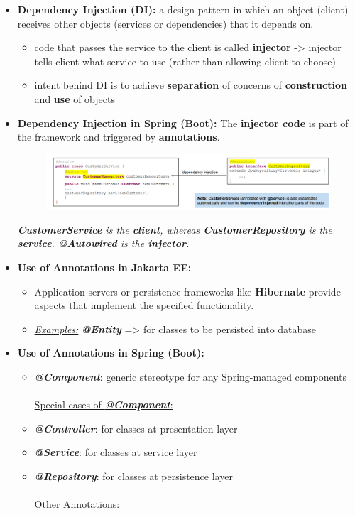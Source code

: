 \documentclass[ieeetran]{article}
\begin{document}
\begin{itemize}
\item \textbf{Dependency Injection (DI):} a design pattern in which an object (client) receives other objects (services or dependencies) that it depends on. 
	\begin{itemize} 
	\item code that passes the service to the client is called \textbf{injector} -> injector tells client what service to use (rather than allowing client to choose)

	\item intent behind DI is to achieve \textbf{separation} of concerns of \textbf{construction} and \textbf{use} of objects
	\end{itemize}
\item \textbf{Dependency Injection in Spring (Boot):} The \textbf{injector code} is part of the framework and triggered by \textbf{annotations}.
\begin{figure}[h!]
  \centering
  \includegraphics[width=1.0\linewidth]{dicustomer.png}
  \label{fig:dicustomer_png}
\end{figure}

\textit{\textbf{CustomerService} is the \textbf{client}, whereas \textbf{CustomerRepository} is the \textbf{service}. \textbf{@Autowired} is the \textbf{injector}.}

\item \textbf{Use of Annotations in Jakarta EE:}
\begin{itemize}
  \item Application servers or persistence frameworks like \textbf{Hibernate} provide aspects that implement the specified functionality.
\item \textit{\underline{Examples:}} \textbf{\textit{@Entity}} => for classes to be persisted into database
\end{itemize}
\item \textbf{Use of Annotations in Spring (Boot):}
	\begin{itemize}
	  \item \textbf{\textit{@Component}}: generic stereotype for any Spring-managed components\\ \\
		  \underline{Special cases of \textbf{\textit{@Component}}:}
	\item \textbf{\textit{@Controller}}: for classes at presentation layer
	\item \textbf{\textit{@Service}}: for classes at service layer
\item \textbf{\textit{@Repository}}: for classes at persistence layer\\ \\
	\underline{Other Annotations:}


\end{itemize}
\end{itemize}
\end{document}
